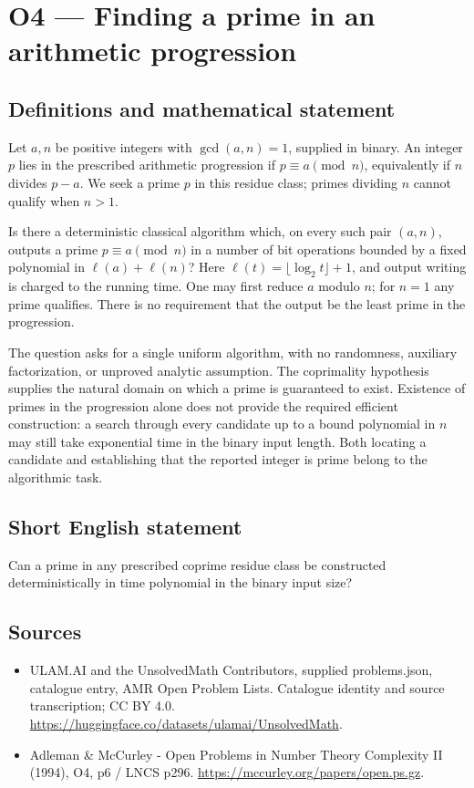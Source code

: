 \documentclass[11pt,a4paper]{article}
\begin{document}
\section*{O4 — Finding a prime in an arithmetic progression}\label{statement}

\subsection{Definitions and mathematical statement}
Let $a,n$ be positive integers with $\gcd(a,n)=1$, supplied in binary. An integer $p$ lies in the prescribed arithmetic progression if $p\equiv a\pmod n$, equivalently if $n$ divides $p-a$. We seek a prime $p$ in this residue class; primes dividing $n$ cannot qualify when $n>1$.

Is there a deterministic classical algorithm which, on every such pair $(a,n)$, outputs a prime $p\equiv a\pmod n$ in a number of bit operations bounded by a fixed polynomial in $\ell(a)+\ell(n)$? Here $\ell(t)=\lfloor\log_2t\rfloor+1$, and output writing is charged to the running time. One may first reduce $a$ modulo $n$; for $n=1$ any prime qualifies. There is no requirement that the output be the least prime in the progression.

The question asks for a single uniform algorithm, with no randomness, auxiliary factorization, or unproved analytic assumption. The coprimality hypothesis supplies the natural domain on which a prime is guaranteed to exist. Existence of primes in the progression alone does not provide the required efficient construction: a search through every candidate up to a bound polynomial in $n$ may still take exponential time in the binary input length. Both locating a candidate and establishing that the reported integer is prime belong to the algorithmic task.
\subsection{Short English statement}
Can a prime in any prescribed coprime residue class be constructed deterministically in time polynomial in the binary input size?
\subsection{Sources}
\begin{itemize}
\item[S1] ULAM.AI and the UnsolvedMath Contributors, supplied problems.json, catalogue entry, AMR Open Problem Lists. Catalogue identity and source transcription; CC BY 4.0.
\url{https://huggingface.co/datasets/ulamai/UnsolvedMath}.
\item[S2] Adleman \& McCurley - Open Problems in Number Theory Complexity II (1994), O4, p6 / LNCS p296. 
\url{https://mccurley.org/papers/open.ps.gz}.
\end{itemize}
\end{document}
